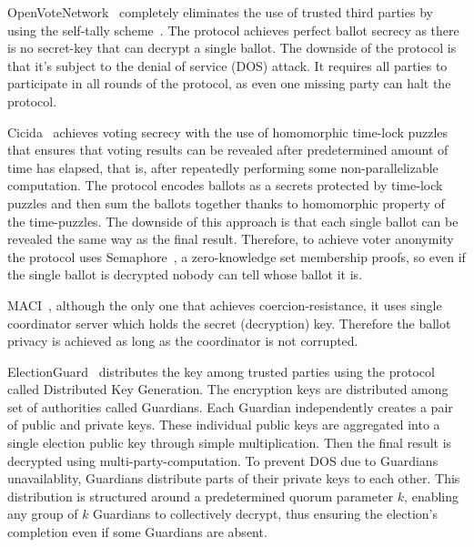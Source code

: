 \documentclass[runningheads]{llncs}
\begin{document}
OpenVoteNetwork~\cite{haoAnonymousVotingTworound2010,mccorrySmartContractBoardroom2017,seifelnasrScalableOpenVoteNetwork2020,elsheikhDisputefreeScalableOpen2022} completely eliminates the use of trusted third parties by using the self-tally scheme~\cite{kiayiasSelftallyingElectionsPerfect2002}. The protocol achieves perfect ballot secrecy as there is no secret-key that can decrypt a single ballot. The downside of the protocol is that it's subject to the denial of service (DOS) attack. It requires all parties to participate in all rounds of the protocol, as even one missing party can halt the protocol.

Cicida~\cite{BuildingCicadaPrivate,A16zCicada2023} achieves voting secrecy with the use of homomorphic time-lock puzzles~\cite{malavoltaHomomorphicTimeLockPuzzles2019} that ensures that voting results can be revealed after predetermined amount of time has elapsed, that is, after repeatedly performing some non-parallelizable computation. The protocol encodes ballots as a secrets protected by time-lock puzzles and then sum the ballots together thanks to homomorphic property of the time-puzzles. The downside of this approach is that each single ballot can be revealed the same way as the final result. Therefore, to achieve voter anonymity the protocol uses Semaphore~\cite{Semaphore}, a zero-knowledge set membership proofs, so even if the single ballot is decrypted nobody can tell whose ballot it is.

MACI~\cite{ethereumfoundationMinimalAntiCollusionInfrastructure2022,PrivacyscalingexplorationsMaci2023}, although the only one that achieves coercion-resistance, it uses single coordinator server which holds the secret (decryption) key. Therefore the ballot privacy is achieved as long as the coordinator is not corrupted.

ElectionGuard~\cite{ElectionGuard} distributes the key among trusted parties using the protocol called Distributed Key Generation. The encryption keys are distributed among set of authorities called Guardians. Each Guardian independently creates a pair of public and private keys. These individual public keys are aggregated into a single election public key through simple multiplication. Then the final result is decrypted using multi-party-computation. To prevent DOS due to Guardians unavailablity, Guardians distribute parts of their private keys to each other. This distribution is structured around a predetermined quorum parameter $k$, enabling any group of $k$ Guardians to collectively decrypt, thus ensuring the election's completion even if some Guardians are absent.
\end{document}
